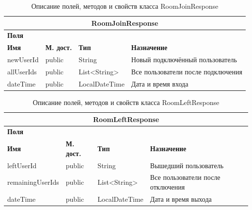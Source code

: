 \documentclass{../includes/TechDoc}
\begin{document}
    \begin{table}[h]
        \caption{\label{tab:class-WebsocketEventListener-table}Описание полей, методов и свойств класса RoomJoinResponse}
        \begin{tabularx}{\textwidth}{|l|l|l|X|}
            \hline
            \multicolumn{4}{|c|}{RoomJoinResponse} \\ \hline
            \multicolumn{4}{|l|}{\textbf{Поля}} \\ \hline
            \textbf{Имя} & \textbf{М. дост.} & \textbf{Тип}  & \textbf{Назначение}                \\ \hline
            newUserId    & public            & String        & Новый подключённый пользователь    \\ \hline
            allUserIds   & public            & List<String>  & Все пользователи после подключения \\ \hline
            dateTime     & public            & LocalDateTime & Дата и время входа                 \\ \hline
        \end{tabularx}
    \end{table}

    \begin{table}[h]
        \caption{\label{tab:class-WebsocketEventListener-table}Описание полей, методов и свойств класса RoomLeftResponse}
        \begin{tabularx}{\textwidth}{|l|l|l|X|}
            \hline
            \multicolumn{4}{|c|}{RoomLeftResponse} \\ \hline
            \multicolumn{4}{|l|}{\textbf{Поля}} \\ \hline
            \textbf{Имя}     & \textbf{М. дост.} & \textbf{Тип}  & \textbf{Назначение}               \\ \hline
            leftUserId       & public            & String        & Вышедший пользователь             \\ \hline
            remainingUserIds & public            & List<String>  & Все пользователи после отключения \\ \hline
            dateTime         & public            & LocalDateTime & Дата и время выхода               \\ \hline
        \end{tabularx}
    \end{table}
\end{document}
